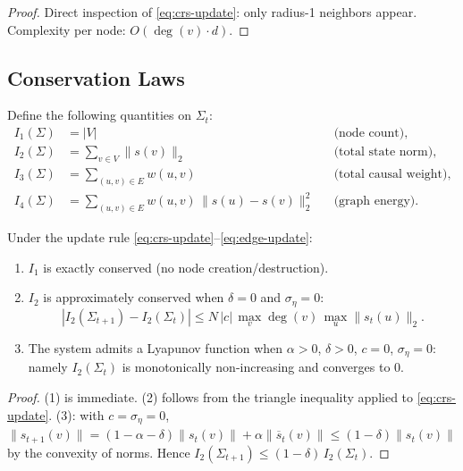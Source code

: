 \begin{proof}
Direct inspection of \eqref{eq:crs-update}: only radius-1 neighbors
appear.  Complexity per node: $O(\deg(v) \cdot d)$.
\end{proof}

\subsection{Conservation Laws}

\begin{definition}\label{def:12.11}
Define the following quantities on $\Sigma_t$:
\begin{align}
  I_1(\Sigma) &= |V| &&\text{(node count)}, \label{eq:inv1} \\
  I_2(\Sigma) &= \sum_{v \in V} \|s(v)\|_2 &&\text{(total state norm)}, \label{eq:inv2} \\
  I_3(\Sigma) &= \sum_{(u,v) \in E} w(u,v) &&\text{(total causal weight)}, \label{eq:inv3} \\
  I_4(\Sigma) &= \sum_{(u,v) \in E} w(u,v)\,\|s(u) - s(v)\|_2^2
    &&\text{(graph energy)}. \label{eq:inv4}
\end{align}
\end{definition}

\begin{theorem}\label{thm:12.6}
Under the update rule \eqref{eq:crs-update}--\eqref{eq:edge-update}:
\begin{enumerate}
  \item $I_1$ is exactly conserved (no node creation/destruction).
  \item $I_2$ is approximately conserved when $\delta = 0$ and $\sigma_\eta = 0$:
    \[
      |I_2(\Sigma_{t+1}) - I_2(\Sigma_t)| \leq
      N\,|c|\,\max_v\deg(v)\,\max_u\|s_t(u)\|_2.
    \]
  \item The system admits a Lyapunov function when $\alpha > 0$,
    $\delta > 0$, $c = 0$, $\sigma_\eta = 0$: namely $I_2(\Sigma_t)$
    is monotonically non-increasing and converges to $0$.
\end{enumerate}
\end{theorem}

\begin{proof}
(1) is immediate.  (2) follows from the triangle inequality applied to
\eqref{eq:crs-update}.  (3): with $c = \sigma_\eta = 0$,
$\|s_{t+1}(v)\| = (1-\alpha-\delta)\|s_t(v)\| + \alpha\|\overline{s}_t(v)\|
\leq (1-\delta)\|s_t(v)\|$ by the convexity of norms.
Hence $I_2(\Sigma_{t+1}) \leq (1-\delta)\,I_2(\Sigma_t)$.
\end{proof}


